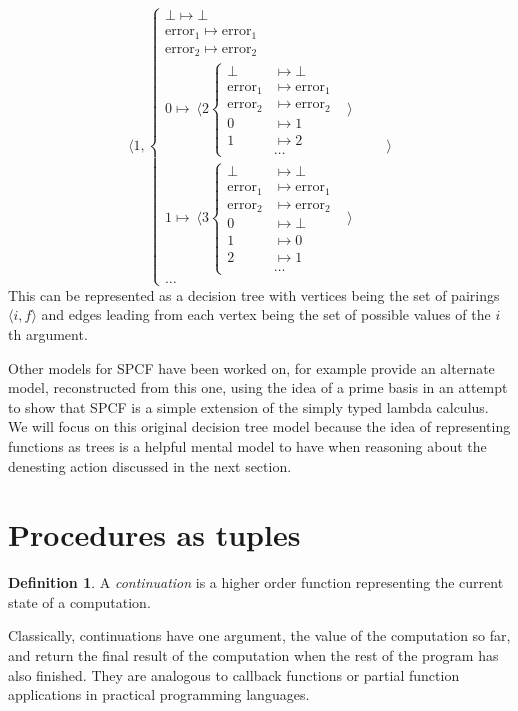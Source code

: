 \documentclass[12pt,a4paper]{report}
\theoremstyle{definition}
\newtheorem{definition}{Definition}[chapter]%
\theoremstyle{remark}
\begin{document}
\[\langle 1, 
\begin{cases}
    \bot \mapsto \bot\\
    \text{error}_1 \mapsto \text{error}_1\\
    \text{error}_2 \mapsto \text{error}_2\\
    0 \mapsto\ \langle 2 \begin{cases}
        \bot &\mapsto \bot\\
        \text{error}_1 &\mapsto \text{error}_1\\
        \text{error}_2 &\mapsto \text{error}_2\\
        0 &\mapsto 1\\
        1 &\mapsto 2\\
          &\dots
    \end{cases} &\rangle\\
    1 \mapsto\ \langle 3 \begin{cases}
        \bot &\mapsto \bot\\
        \text{error}_1 &\mapsto \text{error}_1\\
        \text{error}_2 &\mapsto \text{error}_2\\
        0 &\mapsto \bot\\
        1 &\mapsto 0\\
        2 &\mapsto 1\\
          &\dots
    \end{cases} &\rangle\\
    \dots
\end{cases} \quad\quad\rangle
\]
This can be represented as a decision tree with vertices being the set of pairings  $\langle i, f \rangle$ and edges leading from each vertex being the set of possible values of the $i$th argument. 

Other models for SPCF have been worked on, for example \cite{kanneganti_1993} provide an alternate model, reconstructed from this one, using the idea of a prime basis \citep{Winskel1980EventsIC} in an attempt to show that SPCF is a simple extension of the simply typed lambda calculus. We will focus on this original decision tree model because the idea of representing functions as trees is a helpful mental model to have when reasoning about the denesting action discussed in the next section.

\section{Procedures as tuples}
\begin{definition}
    A \emph{continuation} is a higher order function representing the current state of a computation.
    
    Classically, continuations have one argument, the value of the computation so far, and return the final result of the computation when the rest of the program has also finished. They are analogous to callback functions or partial function applications in practical programming languages. 
\end{definition}
\end{document}
